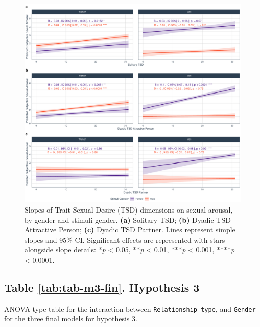 \documentclass[
  bookmarksnumbered]{article}
\begin{document}
\begin{figure}
\centering
\includegraphics{Sexual_Desire_Arousal_files/figure-latex/fig-m2-fin-1.pdf}
\caption{\label{fig:fig-m2-fin}Slopes of Trait Sexual Desire (TSD) dimensions on sexual arousal, by gender and stimuli gender. \textbf{(a)} Solitary TSD; \textbf{(b)} Dyadic TSD Attractive Person; \textbf{(c)} Dyadic TSD Partner. Lines represent simple slopes and 95\% CI. Significant effects are represented with stars alongside slope details: *\emph{p} \textless{} 0.05, **\emph{p} \textless{} 0.01, ***\emph{p} \textless{} 0.001, ****\emph{p} \textless{} 0.0001.}
\end{figure}

\subsection{Table \ref{tab:tab-m3-fin}. Hypothesis 3}\label{table-reftabtab-m3-fin.-hypothesis-3}

ANOVA-type table for the interaction between \texttt{Relationship\ type}, and \texttt{Gender} for the three final models for hypothesis 3.
\end{document}
